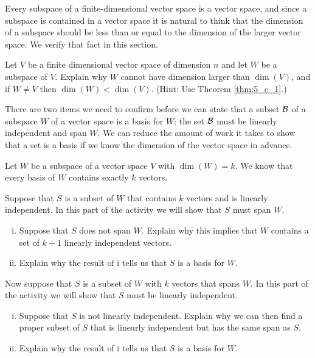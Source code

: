 \label{sec:dim_subspace}

Every subspace of a finite-dimensional vector space is a vector space, and since a subspace is contained in a vector space it is natural to think that the dimension of a subspace should be less than or equal to the dimension of the larger vector space. We verify that fact in this section.


\begin{activity} \label{act:5_c_3} Let $V$ be a finite dimensional vector space of dimension $n$ and let $W$ be a subspace of $V$. Explain why $W$ cannot have dimension larger than $\dim(V)$, and if $W \neq V$ then $\dim(W) < \dim(V)$. (Hint: Use Theorem \ref{thm:5_c_1}.)

\end{activity}


\label{sec:cond_basis_vec_space}

There are two items we need to confirm before we can state that a subset $\mathcal{B}$ of a subspace $W$ of a vector space is a basis for $W$: the set $\mathcal{B}$ must be linearly independent and span $W$. We can reduce the amount of work it takes to show that a set is a basis if we know the dimension of the vector space in advance. 


\begin{activity} \label{act:5_c_5} Let $W$ be a subspace of a vector space $V$ with $\dim(W) = k$. We know that every basis of $W$ contains exactly $k$ vectors. 
	\ba
	\item Suppose that $S$ is a subset of $W$ that contains $k$ vectors and is linearly independent. In this part of the activity we will show that $S$ must span $W$.
		\begin{enumerate}[i.]
		\item Suppose that $S$ does not span $W$. Explain why this implies that $W$ contains a set of $k+1$ linearly independent vectors. 		

	\item Explain why the result of i tells us that $S$ is a basis for $W$. 

	\end{enumerate}

\item Now suppose that $S$ is a subset of $W$ with $k$ vectors that spans $W$. In this part of the activity we will show that $S$ must be linearly independent.
	\begin{enumerate}[i.]
	\item Suppose that $S$ is not linearly independent. Explain why we can then find a proper subset of $S$ that is linearly independent but has the same span as $S$. 


	\item Explain why the result of i tells us that $S$ is a basis for $W$. 


	\end{enumerate}

\ea

\end{activity}



